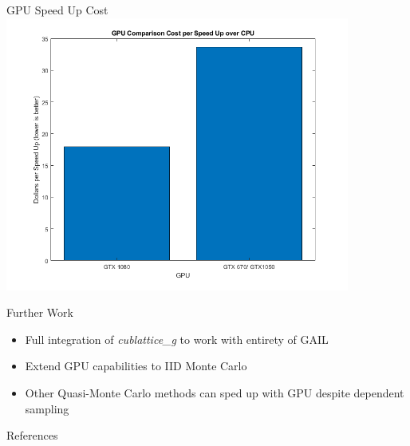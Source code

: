 \documentclass[11pt]{beamer}
\begin{document}
\begin{frame}{GPU Speed Up Cost}
\centering
\includegraphics[width=0.85\textwidth]{gpuspeedup.png} 
\end{frame}

\begin{frame}{Further Work}
\begin{itemize}
\item Full integration of \textit{cublattice\_g} to work with entirety of GAIL
\item Extend GPU capabilities to IID Monte Carlo 
\item Other Quasi-Monte Carlo methods can sped up with GPU despite dependent sampling
\end{itemize}
\end{frame}

\begin{frame}{References}


\end{frame}
\end{document}
